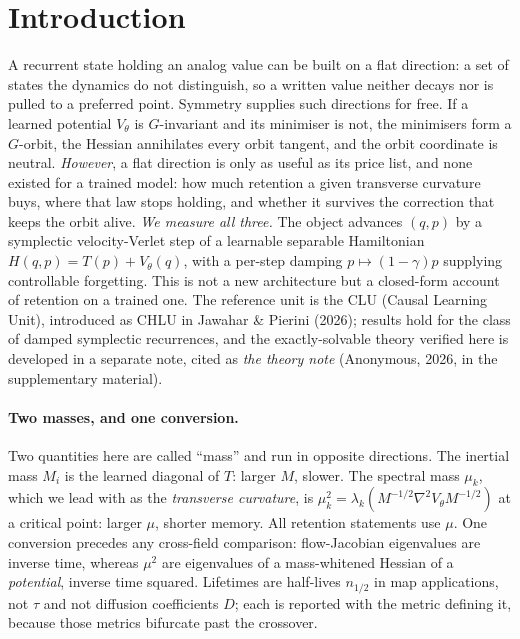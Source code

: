 \documentclass{article}
\begin{document}
\section{Introduction}\label{sec:intro}

A recurrent state holding an analog value can be built on a flat direction: a set of states the dynamics do not distinguish, so a written value neither decays nor is pulled to a preferred point. Symmetry supplies such directions for free. If a learned potential $V_\theta$ is $G$-invariant and its minimiser is not, the minimisers form a $G$-orbit, the Hessian annihilates every orbit tangent, and the orbit coordinate is neutral. \emph{However}, a flat direction is only as useful as its price list, and none existed for a trained model: how much retention a given transverse curvature buys, where that law stops holding, and whether it survives the correction that keeps the orbit alive. \emph{We measure all three.} The object advances $(q,p)$ by a symplectic velocity-Verlet step of a learnable separable Hamiltonian $H(q,p)=T(p)+V_\theta(q)$, with a per-step damping $p\mapsto(1-\gamma)p$ supplying controllable forgetting. This is not a new architecture but a closed-form account of retention on a trained one. The reference unit is the CLU (Causal Learning Unit), introduced as CHLU in Jawahar \& Pierini (2026); results hold for the class of damped symplectic recurrences, and the exactly-solvable theory verified here is developed in a separate note, cited as \emph{the theory note} (Anonymous, 2026, in the supplementary material).

\paragraph{Two masses, and one conversion.} Two quantities here are called ``mass'' and run in opposite directions. The inertial mass $M_i$ is the learned diagonal of $T$: larger $M$, slower. The spectral mass $\mu_k$, which we lead with as the \emph{transverse curvature}, is $\mu_k^2=\lambda_k(M^{-1/2}\nabla^2V_\theta M^{-1/2})$ at a critical point: larger $\mu$, shorter memory. All retention statements use $\mu$. One conversion precedes any cross-field comparison: flow-Jacobian eigenvalues are inverse time, whereas $\mu^2$ are eigenvalues of a mass-whitened Hessian of a \emph{potential}, inverse time squared. Lifetimes are half-lives $n_{1/2}$ in map applications, not $\tau$ and not diffusion coefficients $D$; each is reported with the metric defining it, because those metrics bifurcate past the crossover.
\end{document}
